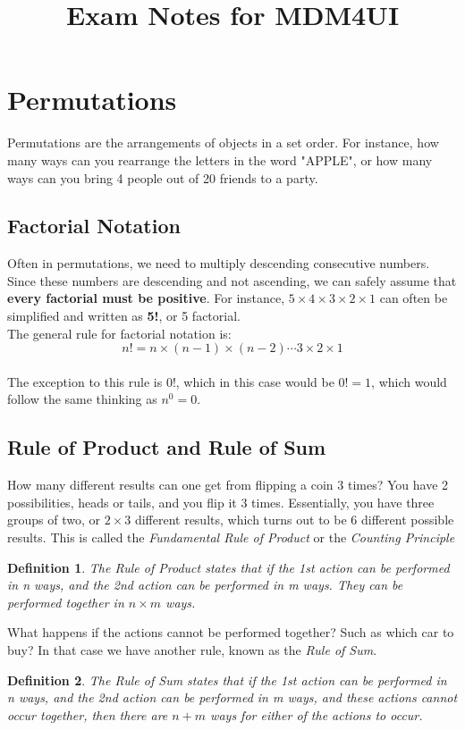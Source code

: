 \documentclass[final,1p,12pt]{elsarticle}
\newtheorem{definition}{Definition}
\begin{document}
\begin{frontmatter}
    \title{Exam Notes for MDM4UI}
    
\end{frontmatter}


\section{Permutations}
Permutations are the arrangements of objects in a set order. 
For instance, how many ways can you rearrange the letters in the word "APPLE", 
or how many ways can you bring 4 people out of 20 friends to a party.

    \subsection{Factorial Notation}
    Often in permutations, we need to multiply descending consecutive numbers. Since these numbers
    are descending and not ascending, we can safely assume that \textbf{every factorial must be positive}. 
    For instance,  $5\times4\times3\times2\times1$ can often be simplified and written as \textbf{5!}, or 5 factorial.\\
    The general rule for factorial notation is: \[ n! = n\times(n-1)\times(n-2)\cdots3\times2\times1 \]\\
    The exception to this rule is 0!, which in this case would be $0! = 1$, which would follow the same thinking as $n^0=0$.
    
    \subsection{Rule of Product and Rule of Sum}
    How many different results can one get from flipping a coin 3 times? You have 2 possibilities, heads or tails, and you flip it 3 times. Essentially, you have three groups of two, or $2\times3$ different results, which turns out to be $6$ different possible results. This is called the \emph{Fundamental Rule of Product} or the \emph{Counting Principle}
    \begin{definition}
        The Rule of Product states that if the 1st action can be performed in n ways, and the 2nd action can be performed in m ways.
        They can be performed together in $n\times m$ ways. 
    \end{definition}
    \clearpage
    What happens if the actions cannot be performed together? Such as which car to buy? In that case we have another rule, known as the \emph{Rule of Sum}.
    \begin{definition}
        The Rule of Sum states that if the 1st action can be performed in n ways, and the 2nd action can be performed in m ways, and these actions cannot occur together, then there are $n+m$ ways for either of the actions to occur.
    \end{definition}
    
\end{document}

